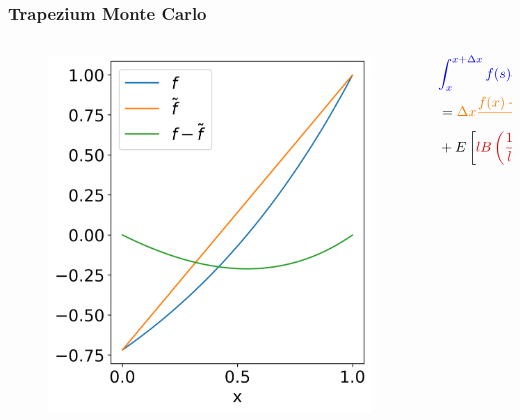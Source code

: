 \documentclass[20pt]{beamer}
\begin{document}
\begin{frame}
    \frametitle{Trapezium Monte Carlo}
    \begin{columns}[t]
        \begin{column}{0.55\textwidth}
            \vspace*{-2cm}
            \begin{figure}[h]
                \includegraphics[height=0.8\textheight]{"imgs/control_variate.png"}
            \end{figure}
        \end{column}
        \begin{column}{0.45\textwidth}
            \fontsize{14}{16}\selectfont
            \begin{align*}
                \hspace{0.1cm} & \textcolor{blue!95!black}{\int_{x}^{x+\Delta x} f(s) ds}               \\
                               & = \textcolor{orange!95!black}{\Delta x \frac{f(x) + f(x+\Delta x)}{2}} \\
                               & +E \left[\textcolor{red!90!black}{l B\left( \frac{1}{l}\right)}
                    \textcolor{green!80!black}{(f(S_x) - \tilde{f}(S_x))}\right]
            \end{align*}
        \end{column}
    \end{columns}

\end{frame}
\end{document}
